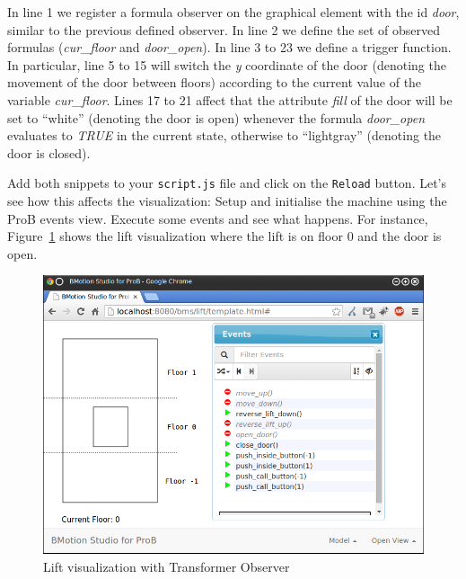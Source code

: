In line 1 we register a formula observer on the graphical element with the id \textit{door}, similar to the previous defined observer.
In line 2 we define the set of observed formulas (\textit{cur\_floor} and \textit{door\_open}).
In line 3 to 23 we define a trigger function.
In particular, line 5 to 15 will switch the \textit{y} coordinate of the door (denoting the movement of the door between floors) according to the current value of the variable \textit{cur\_floor}.
Lines 17 to 21 affect that the attribute \textit{fill} of the door will be set to ``white'' (denoting the door is open) whenever the formula \textit{door\_open} evaluates to \textit{TRUE} in the current state, otherwise to ``lightgray'' (denoting the door is closed).

Add both snippets to your \texttt{script.js} file and click on the \texttt{Reload} button.
Let's see how this affects the visualization:
Setup and initialise the machine using the ProB events view.
Execute some events and see what happens.
For instance, Figure~\ref{fig_tut_04_running2} shows the lift visualization where the lift is on floor 0 and the door is open.

\begin{figure}[!ht]
\begin{center}
	\includegraphics[width=12cm]{img/tutorial/tut_04.png}
	\caption{Lift visualization with Transformer Observer}
	\label{fig_tut_04_running2}
\end{center}
\end{figure}

